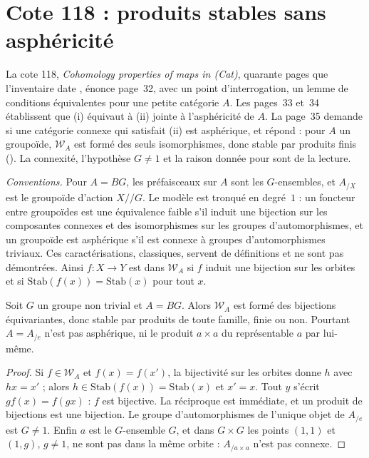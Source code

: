 \section[Cote 118 : produits stables sans asphéricité]{Cote 118 : produits stables sans asphéricité\protect{}}\label{sec:118}

La cote 118, \emph{Cohomology properties of maps in (Cat)}, quarante pages que l'inventaire date \q{[à partir de 1983]}, énonce page~32, avec un point d'interrogation, un lemme de conditions équivalentes pour une petite catégorie $A$. Les pages~33 et~34 établissent que (i)  équivaut à (ii)  jointe à l'asphéricité de $A$. La page~35 demande si une catégorie connexe qui satisfait (ii) est asphérique, et répond  : pour $A$ un groupoïde, $\mathcal W_A$ est formé des seuls isomorphismes, donc stable par produits finis (). La connexité, l'hypothèse $G \neq 1$ et la raison donnée pour  sont de la lecture.

\noindent\emph{Conventions.} Pour $A = BG$, les préfaisceaux sur $A$ sont les $G$-ensembles, et $A_{/X}$ est le groupoïde d'action $X /\!/ G$. Le modèle est tronqué en degré~$1$ : un foncteur entre groupoïdes est une équivalence faible s'il induit une bijection sur les composantes connexes et des isomorphismes sur les groupes d'automorphismes, et un groupoïde est asphérique s'il est connexe à groupes d'automorphismes triviaux. Ces caractérisations, classiques, servent de définitions et ne sont pas démontrées. Ainsi $f : X \to Y$ est dans $\mathcal W_A$ si $f$ induit une bijection sur les orbites et si $\mathrm{Stab}(f(x)) = \mathrm{Stab}(x)$ pour tout $x$.

\begin{encadre}
\begin{contrexemple}
Soit $G$ un groupe non trivial et $A = BG$. Alors $\mathcal W_A$ est formé des bijections équivariantes, donc stable par produits de toute famille, finie ou non. Pourtant $A = A_{/e}$ n'est pas asphérique, ni le produit $a \times a$ du représentable $a$ par lui-même.
\end{contrexemple}
\end{encadre}

\begin{proof}
Si $f \in \mathcal W_A$ et $f(x) = f(x')$, la bijectivité sur les orbites donne $h$ avec $hx = x'$ ; alors $h \in \mathrm{Stab}(f(x)) = \mathrm{Stab}(x)$ et $x' = x$. Tout $y$ s'écrit $g f(x) = f(gx)$ : $f$ est bijective. La réciproque est immédiate, et un produit de bijections est une bijection. Le groupe d'automorphismes de l'unique objet de $A_{/e}$ est $G \neq 1$. Enfin $a$ est le $G$-ensemble $G$, et dans $G \times G$ les points $(1, 1)$ et $(1, g)$, $g \neq 1$, ne sont pas dans la même orbite : $A_{/a \times a}$ n'est pas connexe.
\end{proof}

